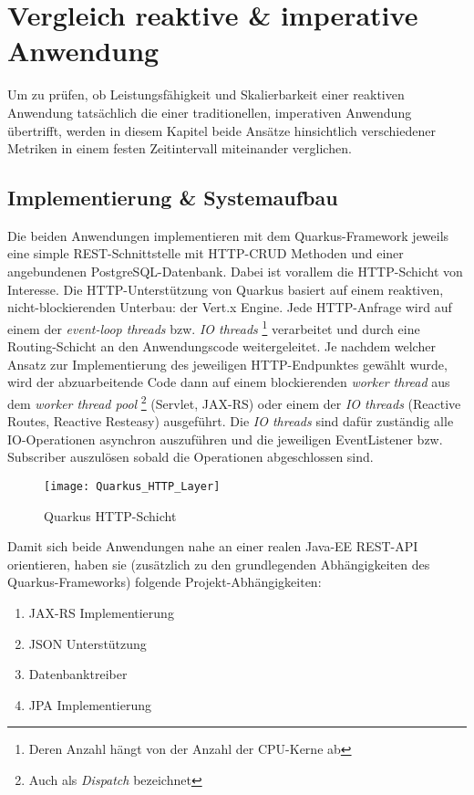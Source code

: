 \section {Vergleich reaktive \& imperative Anwendung}
\label{section:vergleich_reaktiv_imperativ}
Um zu prüfen, ob Leistungsfähigkeit und Skalierbarkeit einer reaktiven Anwendung tatsächlich die einer traditionellen, imperativen Anwendung
übertrifft, werden in diesem Kapitel beide Ansätze hinsichtlich verschiedener Metriken in einem festen Zeitintervall miteinander verglichen.

\subsection{Implementierung \& Systemaufbau}
\label{section:implementierung}
Die beiden Anwendungen implementieren mit dem Quarkus-Framework jeweils eine simple REST-Schnittstelle mit HTTP-CRUD Methoden
und einer angebundenen PostgreSQL-Datenbank.
Dabei ist vorallem die HTTP-Schicht von Interesse. Die HTTP-Unterstützung von Quarkus basiert auf einem reaktiven, nicht-blockierenden
Unterbau: der Vert.x Engine.
Jede HTTP-Anfrage wird auf einem der \textit{event-loop threads} bzw. \textit{IO threads}
\footnote{Deren Anzahl hängt von der Anzahl der CPU-Kerne ab}
verarbeitet und durch eine Routing-Schicht an den Anwendungscode weitergeleitet.
Je nachdem welcher Ansatz zur Implementierung des jeweiligen HTTP-Endpunktes gewählt wurde,
wird der abzuarbeitende Code dann auf einem blockierenden \textit{worker thread} aus dem \textit{worker thread pool}
\footnote{Auch als \textit{Dispatch} bezeichnet} (Servlet, JAX-RS) oder einem der
\textit{IO threads} (Reactive Routes, Reactive Resteasy) ausgeführt.
Die \textit{IO threads} sind dafür zuständig alle IO-Operationen asynchron auszuführen und die jeweiligen EventListener bzw. Subscriber 
auszulösen sobald die Operationen abgeschlossen sind.
\newpage
\begin{figure}[h!]
    \centering
    \texttt{[image: Quarkus\_HTTP\_Layer]}
    \caption{Quarkus HTTP-Schicht \parencite{QuarkusReactiveRoutes}}
\end{figure}

Damit sich beide Anwendungen nahe an einer realen Java-EE REST-API orientieren, haben
sie (zusätzlich zu den grundlegenden Abhängigkeiten des Quarkus-Frameworks) folgende Projekt-Abhängigkeiten:
\begin{enumerate}
    \item JAX-RS Implementierung
    \item JSON Unterstützung
    \item Datenbanktreiber
    \item JPA Implementierung
\end{enumerate}


